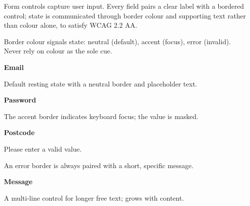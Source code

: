 
Form controls capture user input. Every field pairs a clear label with a bordered
control; state is communicated through border colour and supporting text rather than
colour alone, to satisfy WCAG 2.2 AA.

{\small\color{muted} Border colour signals state: neutral (default), accent (focus),
error (invalid). Never rely on colour as the sole cue.}

\vspace{4mm}

{\small\textbf{Email}}\par
\vspace{1mm}

{\small\color{muted} Default resting state with a neutral border and placeholder text.}

\vspace{4mm}

{\small\textbf{Password}}\par
\vspace{1mm}
\uifieldbox[accent]{\color{muted}\textbullet\textbullet\textbullet\textbullet\textbullet}

{\small\color{muted} The accent border indicates keyboard focus; the value is masked.}

\vspace{4mm}

{\small\textbf{Postcode}}\par
\vspace{1mm}
\vspace{1mm}\par
{\small\color{error} Please enter a valid value.}

{\small\color{muted} An error border is always paired with a short, specific message.}

\vspace{4mm}

{\small\textbf{Message}}\par
\vspace{1mm}

{\small\color{muted} A multi-line control for longer free text; grows with content.}

